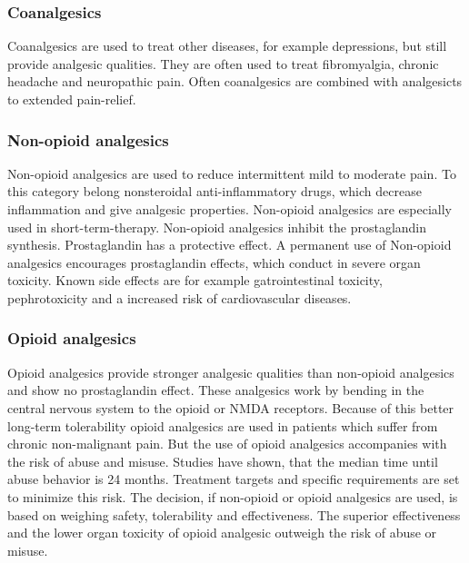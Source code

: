 \subsubsection{Coanalgesics}

Coanalgesics are used to treat other diseases, for example depressions, but still provide analgesic qualities. They are often used to treat fibromyalgia, chronic headache and neuropathic pain. Often coanalgesics are combined with analgesicts to extended pain-relief. \cite{marcus2009}

\subsubsection{Non-opioid analgesics}

Non-opioid analgesics are used to reduce intermittent mild to moderate pain. To this category belong nonsteroidal anti-inflammatory drugs, which decrease inflammation and give analgesic properties. Non-opioid analgesics are especially used in short-term-therapy. Non-opioid analgesics inhibit the prostaglandin synthesis. Prostaglandin has a protective effect. A permanent use of Non-opioid analgesics encourages prostaglandin effects, which conduct in severe organ toxicity. Known side effects are for example gatrointestinal toxicity, pephrotoxicity and a increased risk of cardiovascular diseases. \cite{marcus2009,stein2007}

\subsubsection{Opioid analgesics}

Opioid analgesics provide stronger analgesic qualities than non-opioid analgesics and show no prostaglandin effect. These analgesics work by bending in the central nervous system to the opioid or NMDA receptors.  Because of this better long-term tolerability opioid analgesics are used in patients which suffer from chronic non-malignant pain. But the use of opioid analgesics accompanies with the risk of abuse and misuse. Studies have shown, that the median time until abuse behavior is 24 months. Treatment targets and specific requirements are set to minimize this risk. \cite{marcus2009,stein2007}
The decision, if non-opioid or opioid analgesics are used, is based on weighing safety, tolerability and effectiveness. The superior effectiveness and the lower organ toxicity of opioid analgesic outweigh the risk of abuse or misuse. \cite{marcus2009}